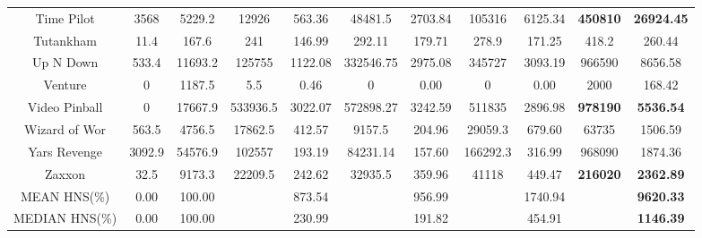 \documentclass[nohyperref]{article}
\def\GDIHmeanhns{9620.33}
\def\GDIHmedianhns{1146.39}
\def\rainbowmeanhns{873.54}
\def\rainbowmedianhns{230.99}
\def\impalameanhns{956.99}
\def\impalamedianhns{191.82}
\def\lasermeanhns{1740.94}
\def\lasermedianhns{454.91}
\theoremstyle{plain}
\begin{document}
\begin{table}[!hb]
\begin{center}
\begin{tabular}{ |c| c| c| c c| c c| c c| c c|}
 Time Pilot & 3568 & 5229.2         & 12926 & 563.36     & 48481.5  & 2703.84 & 105316  & 6125.34                            &\textbf{450810}          &\textbf{26924.45}   \\
 Tutankham  & 11.4 & 167.6          & 241   & 146.99     & 292.11   & 179.71  & 278.9   & 171.25                    &418.2           &260.44  \\
 Up N Down  & 533.4 & 11693.2       & 125755 & 1122.08 & 332546.75 & 2975.08 & 345727 & 3093.19                       &966590          &8656.58    \\
 Venture    & 0     & 1187.5        & 5.5    & 0.46    & 0         & 0.00    & 0      & 0.00                         &2000            &168.42   \\
 Video Pinball & 0 & 17667.9        & 533936.5 & 3022.07 & 572898.27 & 3242.59 & 511835 & 2896.98                                  &\textbf{978190} &\textbf{5536.54}     \\
 Wizard of Wor & 563.5 & 4756.5     & 17862.5 & 412.57 & 9157.5    & 204.96  & 29059.3 & 679.60                       &63735           &1506.59     \\
 Yars Revenge & 3092.9 & 54576.9    & 102557 & 193.19 & 84231.14  & 157.60 & 166292.3  & 316.99                        &968090          &1874.36     \\
 Zaxxon       & 32.5   & 9173.3     & 22209.5 & 242.62 & 32935.5   & 359.96 & 41118    & 449.47                       &\textbf{216020} &\textbf{2362.89}     \\
\hline
MEAN HNS(\%)        &     0.00 & 100.00   &         & \rainbowmeanhns &         & \impalameanhns  &        & \lasermeanhns      &      & \textbf{\GDIHmeanhns} \\
\hline
MEDIAN HNS(\%)      & 0.00   & 100.00   &         & \rainbowmedianhns &         &  \impalamedianhns  &        & \lasermedianhns         &      & \textbf{\GDIHmedianhns} \\
\hline
\end{tabular}
\end{center}
\end{table}
\clearpage
\end{document}
